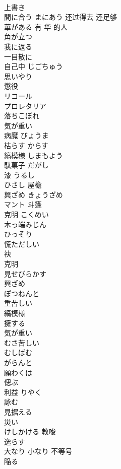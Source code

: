 \documentclass[8pt]{extreport}
\begin{document}
\begin{CJK}{UTF8}{min}
\\	上書き	
\\	間に合う	まにあう 还过得去 还足够
\\	華がある	有 华 的人
\\	角が立つ	
\\	我に返る	
\\	一目散に	
\\	自己中	じごちゅう
\\	思いやり	
\\	懲役	
\\	リコール	
\\	プロレタリア	
\\	落ちこぼれ	
\\	気が重い	
\\	病魔	びょうま
\\	枯らす	からす
\\	縞模様	しまもよう
\\	駄菓子	だがし
\\	漆	うるし
\\	ひさし	屋檐
\\	興ざめ	きょうざめ
\\	マント	斗篷
\\	克明	こくめい
\\	木っ端みじん	
\\	ひっそり	
\\	慌ただしい	
\\	袂	
\\	克明	
\\	見せびらかす	
\\	興ざめ	
\\	ぽつねんと	
\\	重苦しい	
\\	縞模様	
\\	擁する	
\\	気が重い	
\\	むさ苦しい	
\\	むしばむ	
\\	がらんと	
\\	願わくは	
\\	偲ぶ	
\\	利益	りやく
\\	詠む	
\\	見据える	
\\	災い	
\\	けしかける	教唆
\\	逸らす	
\\	大なり 小なり	不等号
\\	陥る	
\end{CJK}
\end{document}
